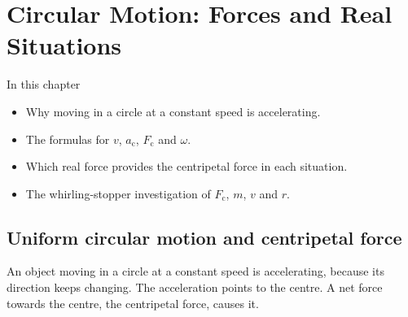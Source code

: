 \chapter[Circular Motion: Forces]{Circular Motion: Forces and Real Situations}\label{ch2:chap}

\begin{summarybox}[unbreakable]{In this chapter}
\begin{itemize}
  \item Why moving in a circle at a constant speed is accelerating.
  \item The formulas for $v$, $a_\mathrm{c}$, $F_\mathrm{c}$ and $\omega$.
  \item Which real force provides the centripetal force in each situation.
  \item The whirling-stopper investigation of $F_\mathrm{c}$, $m$, $v$ and $r$.
\end{itemize}
\end{summarybox}

\section{Uniform circular motion and centripetal force}\label{ch2:sec:ucm}

\begin{bigidea}
An object moving in a circle at a constant speed is accelerating, because its direction
keeps changing. The acceleration points to the centre. A net force towards the centre,
the centripetal force, causes it.
\end{bigidea}

\begin{keywords}
\end{keywords}

